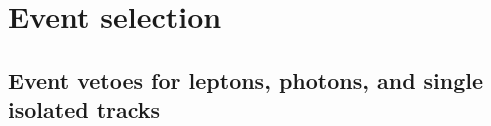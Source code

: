 \clearpage
\section{Event selection \label{sec:selection}}

\subsection{Event vetoes for leptons, photons, and single isolated tracks\label{sec:vetoes}}

%
%
